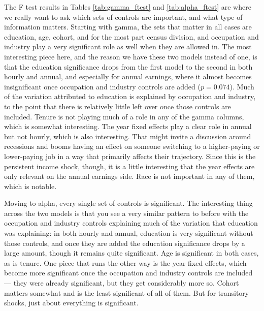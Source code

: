 \documentclass[12pt]{article}
\begin{document}
\begin{onehalfspace}
The F test results in Tables \ref{tab:gamma_ftest} and \ref{tab:alpha_ftest} are where we really want to ask which sets of controls are important, and what type of information matters. Starting with gamma, the sets that matter in all cases are education, age, cohort, and for the most part census division, and occupation and industry play a very significant role as well when they are allowed in. The most interesting piece here, and the reason we have these two models instead of one, is that the education significance drops from the first model to the second in both hourly and annual, and especially for annual earnings, where it almost becomes insignificant once occupation and industry controls are added ($p = 0.074$). Much of the variation attributed to education is explained by occupation and industry, to the point that there is relatively little left over once those controls are included. Tenure is not playing much of a role in any of the gamma columns, which is somewhat interesting. The year fixed effects play a clear role in annual but not hourly, which is also interesting. That might invite a discussion around recessions and booms having an effect on someone switching to a higher-paying or lower-paying job in a way that primarily affects their trajectory. Since this is the persistent income shock, though, it is a little interesting that the year effects are only relevant on the annual earnings side. Race is not important in any of them, which is notable.

\begin{table}[H]
    \centering
    \caption{Gamma Regressions: F-Test Results}
    \label{tab:gamma_ftest}
    \resizebox{\textwidth}{!}{%
        
    }
\end{table}

\begin{table}[H]
    \centering
    \caption{Alpha Regressions: F-Test Results}
    \label{tab:alpha_ftest}
    \resizebox{\textwidth}{!}{%
        
    }
\end{table}


Moving to alpha, every single set of controls is significant. The interesting thing across the two models is that you see a very similar pattern to before with the occupation and industry controls explaining much of the variation that education was explaining: in both hourly and annual, education is very significant without those controls, and once they are added the education significance drops by a large amount, though it remains quite significant. Age is significant in both cases, as is tenure. One piece that runs the other way is the year fixed effects, which become more significant once the occupation and industry controls are included --- they were already significant, but they get considerably more so. Cohort matters somewhat and is the least significant of all of them. But for transitory shocks, just about everything is significant.


\end{onehalfspace}
\end{document}
